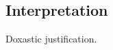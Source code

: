 \subsection{Interpretation}
\label{cha:zSpA:sec:interpretation}

\begin{note}
  Doxastic justification.
\end{note}






